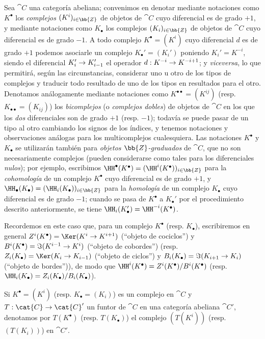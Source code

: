 \documentclass[oneside]{amsart}
\makeatletter
\newcommand{\ega@arrow}[2]{\mathchoice{#1}{#2}{#2}{#2}}
\renewcommand{\to}{\ega@arrow{\longrightarrow}{\rightarrow}}
\let\EGAOriginalLabel\label
\renewcommand{\label}[1]{\phantomsection\EGAOriginalLabel{#1}}
\makeatother
\begin{document}
\begin{env}[11.2.1]
\label{0.11.2.1}
Sea $\cat{C}$ una categoría abeliana; convenimos en denotar mediante notaciones como $K^\bullet$ los \emph{complejos $(K^i)_{i\in\bb{Z}}$} de objetos de $\cat{C}$ cuyo diferencial es de grado $+1$, y mediante notaciones como $K_\bullet$ los complejos $(K_i)_{i\in\bb{Z}}$ de objetos de $\cat{C}$ cuyo diferencial es de grado $-1$.
A todo complejo $K^\bullet=(K^i)$ cuyo diferencial $d$ es de grado $+1$ podemos asociarle un complejo $K_\bullet'=(K_i')$ poniendo $K_i'=K^{-i}$, siendo el diferencial $K_i'\to K_{i-1}'$ el operador $d:K^{-i}\to K^{-i+1}$; y \emph{viceversa}, lo que permitirá, según las circunstancias, considerar uno u otro de los tipos de complejos y traducir todo resultado de uno de los tipos en resultados para el otro.
Denotamos análogamente mediante notaciones como $K^{\bullet\bullet}=(K^{ij})$ (resp. $K_{\bullet\bullet}=(K_{ij})$) los \emph{bicomplejos} (o \emph{complejos dobles}) de objetos de $\cat{C}$ en los que los \emph{dos} diferenciales son de grado $+1$ (resp. $-1$); todavía se puede pasar de un tipo al otro cambiando los signos de los índices, y tenemos notaciones y observaciones análogas para los multicomplejos cualesquiera.
Las notaciones $K^\bullet$ y $K_\bullet$ se utilizarán también para \emph{objetos $\bb{Z}$-graduados} de $\cat{C}$, que no son necesariamente complejos (pueden considerarse como tales para los diferenciales \emph{nulos}); por ejemplo, escribimos $\HH^\bullet(K^\bullet)=(\HH^i(K^\bullet))_{i\in\bb{Z}}$ para la \emph{cohomología} de un complejo $K^\bullet$ cuyo diferencial es de grado $+1$, y $\HH_\bullet(K_\bullet)=(\HH_i(K_\bullet))_{i\in\bb{Z}}$ para la \emph{homología} de un complejo $K_\bullet$ cuyo diferencial es de grado $-1$; cuando se pasa de $K^\bullet$ a $K_\bullet'$ por el procedimiento descrito anteriormente, se tiene $\HH_i(K_\bullet')=\HH^{-i}(K^\bullet)$.

Recordemos en este caso que, para un complejo $K^\bullet$ (resp. $K_\bullet$), escribiremos en general $Z^i(K^\bullet)=\Ker(K^i\to K^{i+1})$ (``objeto de cociclos'') y $B^i(K^\bullet)=\Im(K^{i-1}\to K^i)$ (``objeto de cobordes'') (resp. $Z_i(K_\bullet)=\Ker(K_i\to K_{i-1})$ (``objeto de ciclos'') y $B_i(K_\bullet)=\Im(K_{i+1}\to K_i)$ (``objeto de bordes'')), de modo que $\HH^i(K^\bullet)=Z^i(K^\bullet)/B^i(K^\bullet)$ (resp. $\HH_i(K_\bullet)=Z_i(K_\bullet)/B_i(K_\bullet)$).

Si $K^\bullet=(K^i)$ (resp. $K_\bullet=(K_i)$) es un complejo en $\cat{C}$ y $T:\cat{C}\to\cat{C}'$ un funtor de $\cat{C}$ en una categoría abeliana $\cat{C}'$, denotamos por $T(K^\bullet)$ (resp. $T(K_\bullet)$) el complejo $(T(K^i))$ (resp. $(T(K_i))$) en $\cat{C}'$.


\end{env}
\end{document}
